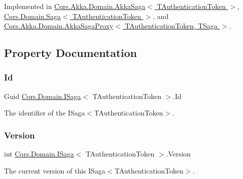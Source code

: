 Implemented in \hyperlink{classCqrs_1_1Akka_1_1Domain_1_1AkkaSaga_a83269fac4653cca097461e924feaea7f_a83269fac4653cca097461e924feaea7f}{Cqrs.\+Akka.\+Domain.\+Akka\+Saga$<$ T\+Authentication\+Token $>$}, \hyperlink{classCqrs_1_1Domain_1_1Saga_a9caac842ea6e88d6e502b63ca1820fe4_a9caac842ea6e88d6e502b63ca1820fe4}{Cqrs.\+Domain.\+Saga$<$ T\+Authentication\+Token $>$}, and \hyperlink{classCqrs_1_1Akka_1_1Domain_1_1AkkaSagaProxy_a5a5c012bc0f7f957b8bd2298956ca9ae_a5a5c012bc0f7f957b8bd2298956ca9ae}{Cqrs.\+Akka.\+Domain.\+Akka\+Saga\+Proxy$<$ T\+Authentication\+Token, T\+Saga $>$}.



\subsection{Property Documentation}
\mbox{\label{interfaceCqrs_1_1Domain_1_1ISaga_aa470a39d3bcdc506dbd5bf49d127bc3c_aa470a39d3bcdc506dbd5bf49d127bc3c}} 
\subsubsection{\texorpdfstring{Id}{Id}}
{\footnotesize\ttfamily Guid \hyperlink{interfaceCqrs_1_1Domain_1_1ISaga}{Cqrs.\+Domain.\+I\+Saga}$<$ T\+Authentication\+Token $>$.Id\hspace{0.3cm}{\ttfamily [get]}}



The identifier of the I\+Saga$<$\+T\+Authentication\+Token$>$. 

\mbox{\label{interfaceCqrs_1_1Domain_1_1ISaga_a83a02ff45543d670356dde4149cdc614_a83a02ff45543d670356dde4149cdc614}} 
\subsubsection{\texorpdfstring{Version}{Version}}
{\footnotesize\ttfamily int \hyperlink{interfaceCqrs_1_1Domain_1_1ISaga}{Cqrs.\+Domain.\+I\+Saga}$<$ T\+Authentication\+Token $>$.Version\hspace{0.3cm}{\ttfamily [get]}}



The current version of this I\+Saga$<$\+T\+Authentication\+Token$>$. 

